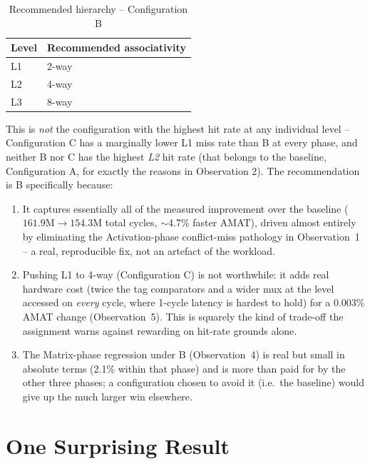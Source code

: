 \documentclass[11pt]{article}
\begin{document}
\begin{table}[H]
\centering
\begin{tabular}{ll}
\toprule
Level & Recommended associativity \\
\midrule
L1 & 2-way \\
L2 & 4-way \\
L3 & 8-way \\
\bottomrule
\end{tabular}
\caption{Recommended hierarchy -- Configuration B}
\end{table}

This is \emph{not} the configuration with the highest hit rate at any
individual level -- Configuration C has a marginally lower L1 miss rate
than B at every phase, and neither B nor C has the highest \emph{L2} hit
rate (that belongs to the baseline, Configuration A, for exactly the
reasons in Observation 2). The recommendation is B specifically because:

\begin{enumerate}[leftmargin=1.6em]
\item It captures essentially all of the measured improvement over the
      baseline ($161.9\text{M}\to154.3\text{M}$ total cycles, $\sim$4.7\%
      faster AMAT), driven almost entirely by eliminating the Activation-phase
      conflict-miss pathology in Observation~1 -- a real, reproducible fix,
      not an artefact of the workload.
\item Pushing L1 to 4-way (Configuration C) is not worthwhile: it adds
      real hardware cost (twice the tag comparators and a wider mux at
      the level accessed on \emph{every} cycle, where 1-cycle latency is
      hardest to hold) for a $0.003\%$ AMAT change (Observation~5). This
      is squarely the kind of trade-off the assignment warns against
      rewarding on hit-rate grounds alone.
\item The Matrix-phase regression under B (Observation~4) is real but
      small in absolute terms (2.1\% within that phase) and is more than
      paid for by the other three phases; a configuration chosen to avoid
      it (i.e.\ the baseline) would give up the much larger win elsewhere.
\end{enumerate}

\section{One Surprising Result}
\end{document}
